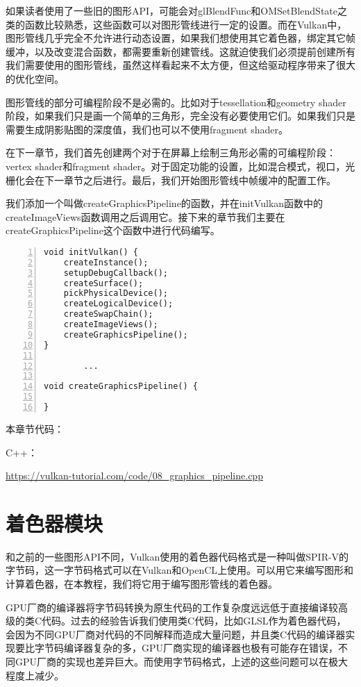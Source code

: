 \documentclass{ctexart}
\begin{document}
如果读者使用了一些旧的图形API，可能会对glBlendFunc和OMSetBlendState之类的函数比较熟悉，这些函数可以对图形管线进行一定的设置。而在Vulkan中，图形管线几乎完全不允许进行动态设置，如果我们想使用其它着色器，绑定其它帧缓冲，以及改变混合函数，都需要重新创建管线。这就迫使我们必须提前创建所有我们需要使用的图形管线，虽然这样看起来不太方便，但这给驱动程序带来了很大的优化空间。

图形管线的部分可编程阶段不是必需的。比如对于tessellation和geometry shader阶段，如果我们只是画一个简单的三角形，完全没有必要使用它们。如果我们只是需要生成阴影贴图的深度值，我们也可以不使用fragment shader。

在下一章节，我们首先创建两个对于在屏幕上绘制三角形必需的可编程阶段：vertex shader和fragment shader。对于固定功能的设置，比如混合模式，视口，光栅化会在下一章节之后进行。最后，我们开始图形管线中帧缓冲的配置工作。

我们添加一个叫做createGraphicsPipeline的函数，并在initVulkan函数中的createImageViews函数调用之后调用它。接下来的章节我们主要在createGraphicsPipeline这个函数中进行代码编写。

\begin{lstlisting}[language={[ANSI]C},keywordstyle=\color{blue!70},commentstyle=\color{red!50!green!50!blue!50},frame=shadowbox, rulesepcolor=\color{red!20!green!20!blue!20},basicstyle=\small,numbers=left, numberstyle=\tiny,breaklines=true]
void initVulkan() {
	createInstance();
	setupDebugCallback();
	createSurface();
	pickPhysicalDevice();
	createLogicalDevice();
	createSwapChain();
	createImageViews();
	createGraphicsPipeline();
}

		...

void createGraphicsPipeline() {

}
\end{lstlisting}

本章节代码：

C++：

\url{https://vulkan-tutorial.com/code/08_graphics_pipeline.cpp}

\newpage
\section{着色器模块}

和之前的一些图形API不同，Vulkan使用的着色器代码格式是一种叫做SPIR-V的字节码，这一字节码格式可以在Vulkan和OpenCL上使用。可以用它来编写图形和计算着色器，在本教程，我们将它用于编写图形管线的着色器。

GPU厂商的编译器将字节码转换为原生代码的工作复杂度远远低于直接编译较高级的类C代码。过去的经验告诉我们使用类C代码，比如GLSL作为着色器代码，会因为不同GPU厂商对代码的不同解释而造成大量问题，并且类C代码的编译器实现要比字节码编译器复杂的多，GPU厂商实现的编译器也极有可能存在错误，不同GPU厂商的实现也差异巨大。而使用字节码格式，上述的这些问题可以在极大程度上减少。
\end{document}
